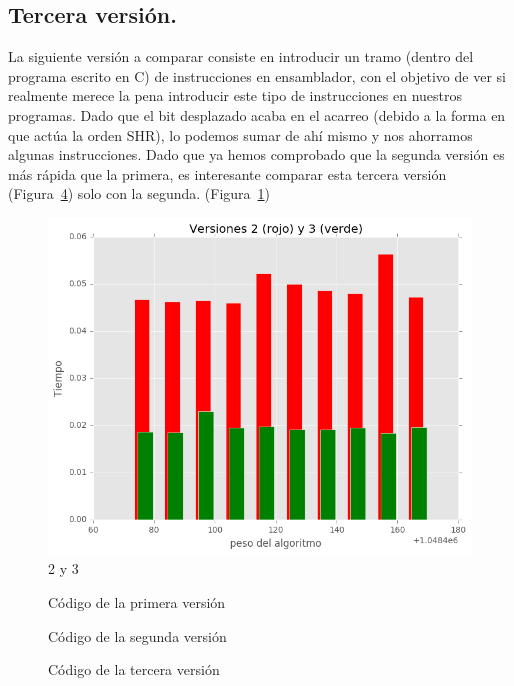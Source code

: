 \documentclass[a4paper, 11pt]{article}
\begin{document}
\subsection{Tercera versión.}
La siguiente versión a comparar consiste en introducir un tramo (dentro del programa escrito en C) de instrucciones en ensamblador, con el objetivo de ver si realmente merece la pena introducir este tipo de instrucciones en nuestros programas. Dado que el bit desplazado acaba en el acarreo (debido a la forma en que actúa la orden SHR), lo podemos sumar de ahí mismo y nos ahorramos algunas instrucciones. Dado que ya hemos comprobado que la segunda versión es más rápida que la primera, es interesante comparar esta tercera versión (Figura~\ref{tercera versión}) solo con la segunda. (Figura~\ref{2y3})
\begin{figure}[!hbp]
	\includegraphics[scale=0.6]{2y3.png}
	\caption{ 2 y 3 	\label{2y3}}
\end{figure}
\begin{figure}[!hbp]
	
	\caption{Código de la primera versión 	\label{primera versión}}
\end{figure}

\begin{figure}[!hbp]
	

	\caption{Código de la segunda versión 	\label{segunda versión}}
\end{figure}

\begin{figure}[!hbp]
	
	\caption{Código de la tercera versión 	\label{tercera versión}}
\end{figure}
\end{document}
